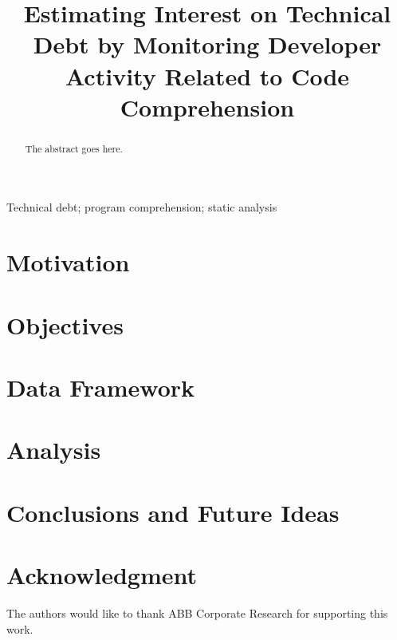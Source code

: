 \documentclass[conference]{IEEEtran}
\begin{document}
\title{Estimating Interest on Technical Debt by Monitoring Developer Activity Related to Code Comprehension}

\author{
\and
{}
}

\maketitle

\begin{abstract}
The abstract goes here.
\end{abstract}

\begin{IEEEkeywords}
Technical debt; program comprehension; static analysis
\end{IEEEkeywords}

\section{Motivation}


\section{Objectives}


\section{Data Framework}
\label{sec:DataFramework}


\section{Analysis}
\label{sec:AnalysisResults}


\section{Conclusions and Future Ideas}


\section*{Acknowledgment}
The authors would like to thank ABB Corporate Research for supporting this work.



\end{document}
